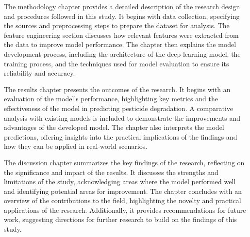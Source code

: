 The methodology chapter provides a detailed description of the research design and procedures followed in this study. It begins with data collection, specifying the sources and preprocessing steps to prepare the dataset for analysis. The feature engineering section discusses how relevant features were extracted from the data to improve model performance. The chapter then explains the model development process, including the architecture of the deep learning model, the training process, and the techniques used for model evaluation to ensure its reliability and accuracy.

The results chapter presents the outcomes of the research. It begins with an evaluation of the model's performance, highlighting key metrics and the effectiveness of the model in predicting pesticide degradation. A comparative analysis with existing models is included to demonstrate the improvements and advantages of the developed model. The chapter also interprets the model predictions, offering insights into the practical implications of the findings and how they can be applied in real-world scenarios.

The discussion chapter summarizes the key findings of the research, reflecting on the significance and impact of the results. It discusses the strengths and limitations of the study, acknowledging areas where the model performed well and identifying potential areas for improvement. The chapter concludes with an overview of the contributions to the field, highlighting the novelty and practical applications of the research. Additionally, it provides recommendations for future work, suggesting directions for further research to build on the findings of this study.